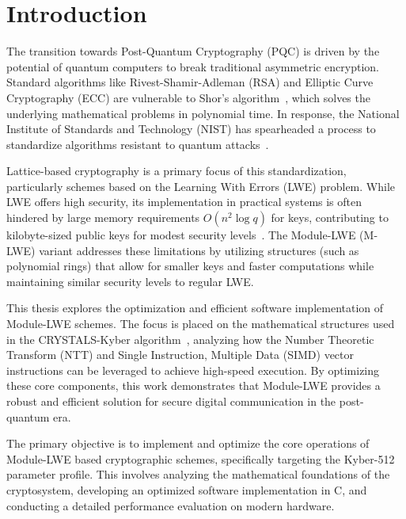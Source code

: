 \chapter*{Introduction}

The transition towards Post-Quantum Cryptography (PQC) is driven by the potential of quantum computers to break traditional asymmetric encryption.
Standard algorithms like Rivest-Shamir-Adleman (RSA) and Elliptic Curve Cryptography (ECC) are vulnerable to Shor's algorithm~\cite{shor1994algorithms}, which solves the underlying mathematical problems in polynomial time.
In response, the National Institute of Standards and Technology (NIST) has spearheaded a process to standardize algorithms resistant to quantum attacks~\cite{fips203}.

Lattice-based cryptography is a primary focus of this standardization, particularly schemes based on the Learning With Errors (LWE) problem.
While LWE offers high security, its implementation in practical systems is often hindered by large memory requirements $O(n^2 \log q)$ for keys, contributing to kilobyte-sized public keys for modest security levels~\cite{Lindner2011-wg}.
The Module-LWE (M-LWE) variant addresses these limitations by utilizing structures (such as polynomial rings) that allow for smaller keys and faster computations while maintaining similar security levels to regular LWE\@.

This thesis explores the optimization and efficient software implementation of Module-LWE schemes. The focus is placed on the mathematical structures used in the CRYSTALS-Kyber algorithm~\cite{kyber_spec_2021}, analyzing how the Number Theoretic Transform (NTT) and Single Instruction, Multiple Data (SIMD) vector instructions can be leveraged to achieve high-speed execution. By optimizing these core components, this work demonstrates that Module-LWE provides a robust and efficient solution for secure digital communication in the post-quantum era.

The primary objective is to implement and optimize the core operations of Module-LWE based cryptographic schemes, specifically targeting the Kyber-512 parameter profile. This involves analyzing the mathematical foundations of the cryptosystem, developing an optimized software implementation in C, and conducting a detailed performance evaluation on modern hardware.

